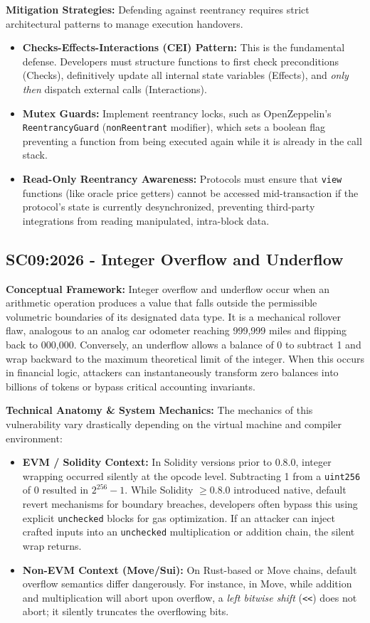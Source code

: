 \textbf{Mitigation Strategies:} Defending against reentrancy requires strict architectural patterns to manage execution handovers.
\begin{itemize}
    \item \textbf{Checks-Effects-Interactions (CEI) Pattern:} This is the fundamental defense. Developers must structure functions to first check preconditions (Checks), definitively update all internal state variables (Effects), and \textit{only then} dispatch external calls (Interactions). 
    \item \textbf{Mutex Guards:} Implement reentrancy locks, such as OpenZeppelin's \texttt{ReentrancyGuard} (\texttt{nonReentrant} modifier), which sets a boolean flag preventing a function from being executed again while it is already in the call stack.
    \item \textbf{Read-Only Reentrancy Awareness:} Protocols must ensure that \texttt{view} functions (like oracle price getters) cannot be accessed mid-transaction if the protocol's state is currently desynchronized, preventing third-party integrations from reading manipulated, intra-block data.
\end{itemize}

\subsection{SC09:2026 - Integer Overflow and Underflow}
\textbf{Conceptual Framework:} Integer overflow and underflow occur when an arithmetic operation produces a value that falls outside the permissible volumetric boundaries of its designated data type. It is a mechanical rollover flaw, analogous to an analog car odometer reaching 999,999 miles and flipping back to 000,000. Conversely, an underflow allows a balance of 0 to subtract 1 and wrap backward to the maximum theoretical limit of the integer. When this occurs in financial logic, attackers can instantaneously transform zero balances into billions of tokens or bypass critical accounting invariants.

\textbf{Technical Anatomy \& System Mechanics:} The mechanics of this vulnerability vary drastically depending on the virtual machine and compiler environment:
\begin{itemize}
    \item \textbf{EVM / Solidity Context:} In Solidity versions prior to 0.8.0, integer wrapping occurred silently at the opcode level. Subtracting 1 from a \texttt{uint256} of 0 resulted in $2^{256}-1$. While Solidity $\ge 0.8.0$ introduced native, default revert mechanisms for boundary breaches, developers often bypass this using explicit \texttt{unchecked} blocks for gas optimization. If an attacker can inject crafted inputs into an \texttt{unchecked} multiplication or addition chain, the silent wrap returns.
    \item \textbf{Non-EVM Context (Move/Sui):} On Rust-based or Move chains, default overflow semantics differ dangerously. For instance, in Move, while addition and multiplication will abort upon overflow, a \textit{left bitwise shift} (\texttt{<<}) does not abort; it silently truncates the overflowing bits. 
\end{itemize}

